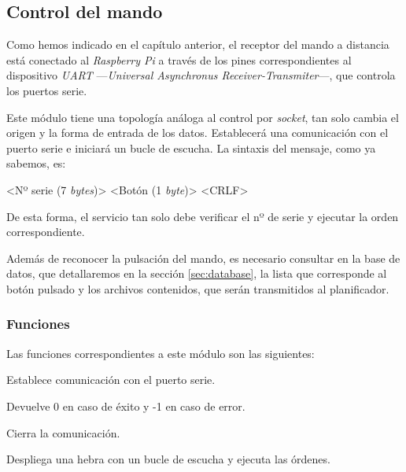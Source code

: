 \smallskip

\subsection{Control del mando}
\label{subsec:daemon_mando}

Como hemos indicado en el capítulo anterior, el receptor del mando a distancia está conectado al \textit{Raspberry Pi} a través de los pines correspondientes al dispositivo \textit{UART} ---\textit{Universal Asynchronus Receiver-Transmiter}---, que controla los puertos serie.

Este módulo tiene una topología análoga al control por \textit{socket}, tan solo cambia el origen y la forma de entrada de los datos. Establecerá una comunicación con el puerto serie e iniciará un bucle de escucha. La sintaxis del mensaje, como ya sabemos, es:

\begin{center}
	<Nº serie (7 \textit{bytes})> <Botón (1 \textit{byte})> <CRLF>
\end{center}

De esta forma, el servicio tan solo debe verificar el nº de serie y ejecutar la orden correspondiente.

Además de reconocer la pulsación del mando, es necesario consultar en la base de datos, que detallaremos en la sección \ref{sec:database}, la lista que corresponde al botón pulsado y los archivos contenidos, que serán transmitidos al planificador.

\subsubsection{Funciones}

Las funciones correspondientes a este módulo son las siguientes:

\begin{description}[style=nextline]
	\item[uart\_init () : \textit{dword}]
	Establece comunicación con el puerto serie.
	
	Devuelve 0 en caso de éxito y -1 en caso de error.
	
	\item[uart\_destroy ()]
	Cierra la comunicación.
	
	\item[uart\_loop ()]
	Despliega una hebra con un bucle de escucha y ejecuta las órdenes.
	
\end{description}

